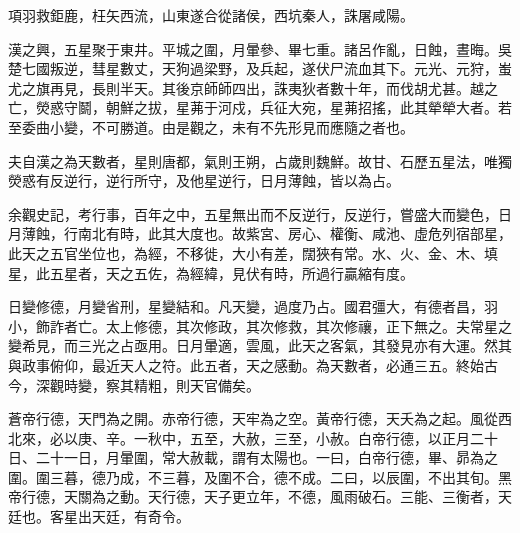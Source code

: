 項羽救鉅鹿，枉矢西流，山東遂合從諸侯，西坑秦人，誅屠咸陽。

漢之興，五星聚于東井。平城之圍，月暈參、畢七重。諸呂作亂，日蝕，晝晦。吳楚七國叛逆，彗星數丈，天狗過梁野，及兵起，遂伏尸流血其下。元光、元狩，蚩尤之旗再見，長則半天。其後京師師四出，誅夷狄者數十年，而伐胡尤甚。越之亡，熒惑守鬬，朝鮮之拔，星茀于河戍，兵征大宛，星茀招搖，此其犖犖大者。若至委曲小變，不可勝道。由是觀之，未有不先形見而應隨之者也。

夫自漢之為天數者，星則唐都，氣則王朔，占歲則魏鮮。故甘、石歷五星法，唯獨熒惑有反逆行，逆行所守，及他星逆行，日月薄蝕，皆以為占。

余觀史記，考行事，百年之中，五星無出而不反逆行，反逆行，嘗盛大而變色，日月薄蝕，行南北有時，此其大度也。故紫宮、房心、權衡、咸池、虛危列宿部星，此天之五官坐位也，為經，不移徙，大小有差，闊狹有常。水、火、金、木、填星，此五星者，天之五佐，為經緯，見伏有時，所過行贏縮有度。

日變修德，月變省刑，星變結和。凡天變，過度乃占。國君彊大，有德者昌，羽小，飾詐者亡。太上修德，其次修政，其次修救，其次修禳，正下無之。夫常星之變希見，而三光之占亟用。日月暈適，雲風，此天之客氣，其發見亦有大運。然其與政事俯仰，最近天人之符。此五者，天之感動。為天數者，必通三五。終始古今，深觀時變，察其精粗，則天官備矣。

蒼帝行德，天門為之開。赤帝行德，天牢為之空。黃帝行德，天夭為之起。風從西北來，必以庚、辛。一秋中，五至，大赦，三至，小赦。白帝行德，以正月二十日、二十一日，月暈圍，常大赦載，謂有太陽也。一曰，白帝行德，畢、昴為之圍。圍三暮，德乃成，不三暮，及圍不合，德不成。二曰，以辰圍，不出其旬。黑帝行德，天關為之動。天行德，天子更立年，不德，風雨破石。三能、三衡者，天廷也。客星出天廷，有奇令。